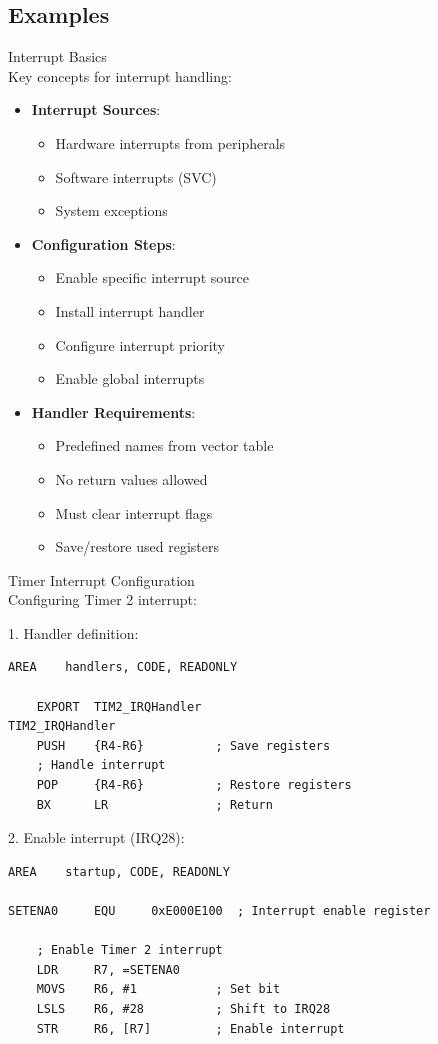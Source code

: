 \subsection{Examples}

\begin{concept}{Interrupt Basics}\\
Key concepts for interrupt handling:
\begin{itemize}
  \item \textbf{Interrupt Sources}:
    \begin{itemize}
      \item Hardware interrupts from peripherals
      \item Software interrupts (SVC)
      \item System exceptions
    \end{itemize}
  \item \textbf{Configuration Steps}:
    \begin{itemize}
      \item Enable specific interrupt source
      \item Install interrupt handler
      \item Configure interrupt priority
      \item Enable global interrupts
    \end{itemize}
  \item \textbf{Handler Requirements}:
    \begin{itemize}
      \item Predefined names from vector table
      \item No return values allowed
      \item Must clear interrupt flags
      \item Save/restore used registers
    \end{itemize}
\end{itemize}
\end{concept}

\begin{example2}{Timer Interrupt Configuration}\\
Configuring Timer 2 interrupt:

1. Handler definition:
\begin{lstlisting}[language=armasm, style=basesmol]
    AREA    handlers, CODE, READONLY
    
    EXPORT  TIM2_IRQHandler
TIM2_IRQHandler
    PUSH    {R4-R6}          ; Save registers
    ; Handle interrupt
    POP     {R4-R6}          ; Restore registers
    BX      LR               ; Return
\end{lstlisting}

2. Enable interrupt (IRQ28):
\begin{lstlisting}[language=armasm, style=basesmol]
    AREA    startup, CODE, READONLY
    
SETENA0     EQU     0xE000E100  ; Interrupt enable register
    
    ; Enable Timer 2 interrupt
    LDR     R7, =SETENA0
    MOVS    R6, #1           ; Set bit
    LSLS    R6, #28          ; Shift to IRQ28
    STR     R6, [R7]         ; Enable interrupt
\end{lstlisting}
\end{example2}

